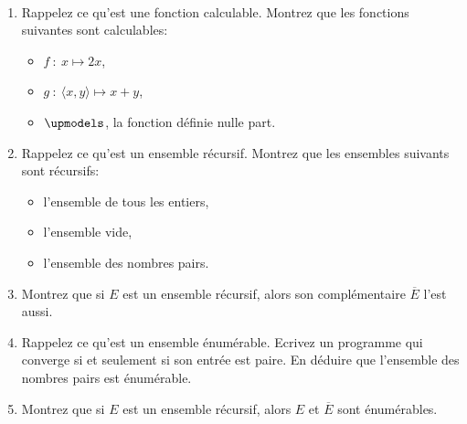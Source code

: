 \begin{td-exo}\label{exo:1}\ %
	\begin{enumerate}
		\item Rappelez ce qu'est une fonction calculable.
		Montrez que les fonctions suivantes sont calculables:
		\begin{itemize}
			\item \(f\ \colon\ x\mapsto 2x\),
			\item \(g\ \colon\ \langle x,y\rangle\mapsto x+y\),
			\item \(\upmodels\), la fonction définie nulle part.
		\end{itemize}

		\item Rappelez ce qu'est un ensemble récursif.
		Montrez que les ensembles suivants sont récursifs:
		\begin{itemize}
			\item l'ensemble de tous les entiers,
			\item l'ensemble vide,
			\item l'ensemble des nombres pairs.
		\end{itemize}

		\item Montrez que si \(E\) est un ensemble récursif, alors son complémentaire \(\overline{E}\) l'est aussi.

		\item Rappelez ce qu'est un ensemble énumérable. Ecrivez un programme qui converge 
		si et seulement si son entrée est paire. En déduire que l'ensemble des nombres pairs est énumérable.

		\item Montrez que si \(E\) est un ensemble récursif, alors \(E\) et \(\overline{E}\) sont énumérables.
	\end{enumerate}
\end{td-exo}

